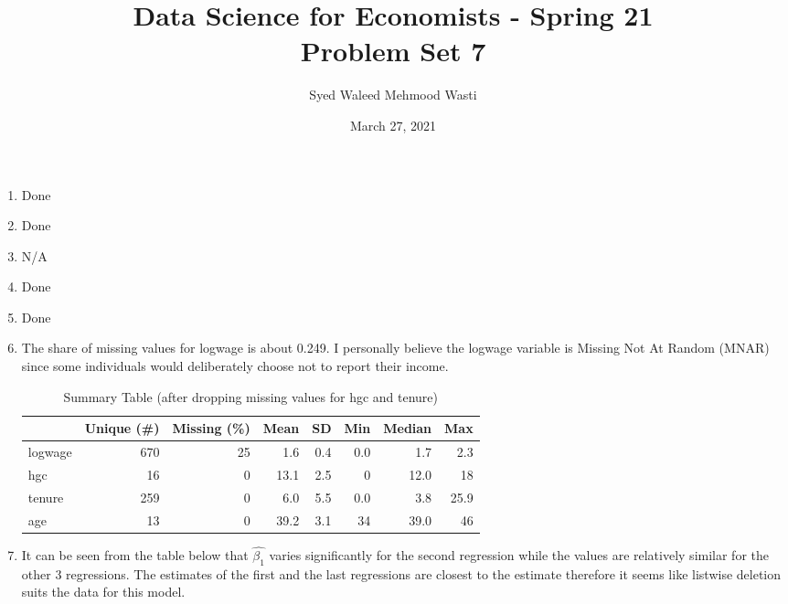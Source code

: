 \documentclass[12pt]{article}
\title{\textbf{Data Science for Economists - Spring 21 \\
\vspace{0.5cm}
Problem Set 7}}
\author{Syed Waleed Mehmood Wasti}
\date{March 27, 2021}
\begin{document}
\begin{titlepage}
\maketitle
\thispagestyle{empty}
\end{titlepage}


\begin{enumerate}

\item
Done

\item
Done

\item
N/A

\item
Done

\item
Done

\item

The share of missing values for logwage is about 0.249. I personally believe the logwage variable is Missing Not At Random (MNAR) since some individuals would deliberately choose not to report their income.  \\


\begin{table}[H]
\centering
\begin{tabular}{|l|r|r|r|r|r|r|r|}
\toprule
  \hline
  & Unique (\#) & Missing (\%) & Mean & SD & Min & Median & Max\\ \hline
\midrule
logwage & 670 & 25 & 1.6 & 0.4 & 0.0 & 1.7 & 2.3\\
hgc & 16 & 0 & 13.1 & 2.5 & 0 & 12.0 & 18\\
tenure & 259 & 0 & 6.0 & 5.5 & 0.0 & 3.8 & 25.9\\
age & 13 & 0 & 39.2 & 3.1 & 34 & 39.0 & 46\\ \hline
\bottomrule
\end{tabular}
\caption{Summary Table (after dropping missing values for hgc and tenure)}
\end{table}


\item


It can be seen from the table below that \(\hat{\beta_1}\) varies significantly for the second regression while the values are relatively similar for the other 3 regressions. The estimates of the first and the last regressions are closest to the estimate therefore it seems like listwise deletion suits the data for this model. 


\end{enumerate}
\end{document}

